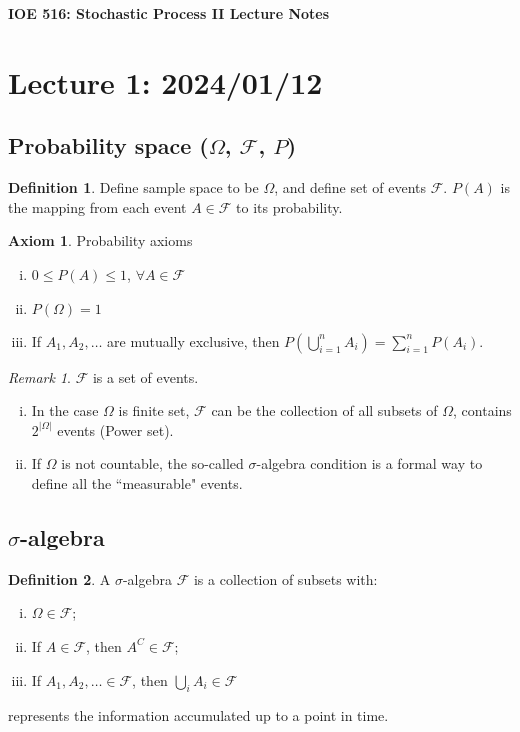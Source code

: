 \documentclass[11pt]{article}
\theoremstyle{definition}
\newtheorem{definition}{Definition}[section]
\newtheorem{axiom}{Axiom}[section]
\theoremstyle{remark}
\newtheorem*{remark}{Remark}
\begin{document}
\begin{center}
\textbf{IOE 516: Stochastic Process II Lecture Notes}
\end{center}
\section{Lecture 1: 2024/01/12}
\subsection{Probability space ($\Omega$, $\mathcal{F}$, $P$)}
    \begin{definition}
        Define sample space to be $\Omega$, and define set of events $\mathcal{F}$. $P(A)$ is the mapping from each event $A \in \mathcal{F}$ to its probability.
    \end{definition}
    \begin{axiom}{Probability axioms}
        \begin{enumerate}[(i)]
            \item $0 \leq P(A) \leq 1$, $\forall A \in \mathcal{F}$
            \item $P(\Omega) = 1$
            \item If $A_1, A_2, \dots$ are mutually exclusive, then $P(\bigcup_{i=1}^n A_i) = \sum_{i=1}^n P(A_i)$.
        \end{enumerate}
    \end{axiom}
    \begin{remark}
        $\mathcal{F}$ is a set of events.
        \begin{enumerate}[(i)]
            \item In the case $\Omega$ is finite set, $\mathcal{F}$ can be the collection of all subsets of $\Omega$, contains $2^{|\Omega|}$ events (Power set).
            \item If $\Omega$ is not countable, the so-called $\sigma$-algebra condition is a formal way to define all the ``measurable" events.
        \end{enumerate}
    \end{remark}
\subsection{$\sigma$-algebra}
    \begin{definition}
    A $\sigma$-algebra $\mathcal{F}$ is a collection of subsets with: \begin{enumerate}[(i)]
        \item $\Omega \in \mathcal{F}$;
        \item If $A \in \mathcal{F}$, then $A^C \in \mathcal{F}$;
        \item If $A_1, A_2, \dots \in \mathcal{F}$, then $\bigcup_{i}A_i \in \mathcal{F}$ 
    \end{enumerate}
    represents the information accumulated up to a point in time.
    \end{definition}
\end{document}
